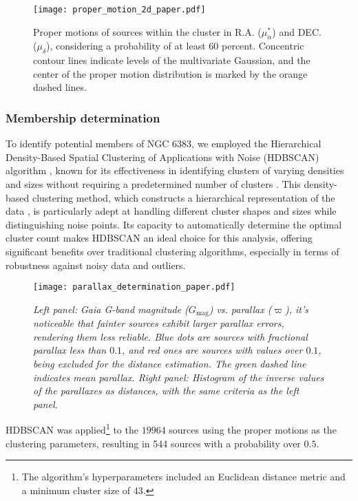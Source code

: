 \documentclass[baaa]{baaa}
\begin{document}
\begin{figure}
    \centering
    \texttt{[image: proper\_motion\_2d\_paper.pdf]}
    \caption{Proper motions of sources within the cluster in R.A. ($\mu_\alpha^*$) and DEC. ($\mu_\delta$), considering a probability of at least $60$ percent. Concentric contour lines indicate levels of the multivariate Gaussian, and the center of the proper motion distribution is marked by the orange dashed lines.}
    \label{fig:proper_motion}
\end{figure}

\subsubsection{Membership determination}

To identify potential members of NGC 6383, we employed the Hierarchical Density-Based Spatial Clustering of Applications with Noise (\textsc{HDBSCAN}) algorithm \citep{10.1007/978-3-642-37456-2_14}, known for its effectiveness in identifying clusters of varying densities and sizes without requiring a predetermined number of clusters \citep{2021A&A...646A.104H}. This density-based clustering method, which constructs a hierarchical representation of the data \citep{McInnes2017}, is particularly adept at handling different cluster shapes and sizes while distinguishing noise points. Its capacity to automatically determine the optimal cluster count makes \textsc{HDBSCAN} an ideal choice for this analysis, offering significant benefits over traditional clustering algorithms, especially in terms of robustness against noisy data and outliers.

\begin{figure*}
    \centering
    \texttt{[image: parallax\_determination\_paper.pdf]}
    \caption{\emph{Left panel:} \sl Gaia \rm G-band magnitude ($G_{\mathrm{mag}}$) vs. parallax ($\varpi$), it's noticeable that fainter sources exhibit larger parallax errors, rendering them less reliable. Blue dots are sources with fractional parallax less than $0.1$, and red ones are sources with values over $0.1$, being excluded for the distance estimation. The green dashed line indicates mean parallax.
    \emph{Right panel:} Histogram of the inverse values of the parallaxes as distances, with the same criteria as the left panel.}
    \label{fig:parallax_distance}
\end{figure*}

\textsc{HDBSCAN} was applied\footnote{The algorithm's hyperparameters included an Euclidean distance metric and a minimum cluster size of $43$.} to the $19964$ sources using the proper motions as the clustering parameters, resulting in 544 sources with a probability over $0.5$.
\end{document}
